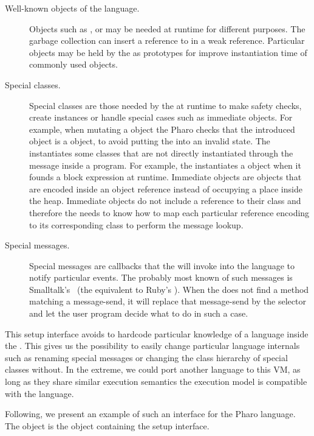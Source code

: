 \begin{description}
\item[Well-known objects of the language.] Objects such as ,  or  may be needed at runtime for different purposes. The garbage collection can insert a reference to  in a weak reference. Particular objects may be held by the \VM as prototypes for improve instantiation time of commonly used objects.
\item[Special classes.] Special classes are those needed by the \VM at runtime to make safety checks, create instances or handle special cases such as immediate objects. For example, when mutating a  object the Pharo \VM checks that the introduced object is a  object, to avoid putting the  into an invalid state. The \VM instantiates some classes that are not directly instantiated through the  message inside a program. For example, the \VM instantiates a  object when it founds a block expression at runtime. Immediate objects are objects that are encoded inside an object reference instead of occupying a place inside the heap. Immediate objects do not include a reference to their class and therefore the \VM needs to know how to map each particular reference encoding to its corresponding class to perform the message lookup. 
\item[Special messages.] Special messages are callbacks that the \VM will invoke into the language to notify particular events. The probably most known of such messages is Smalltalk's ~(the equivalent to Ruby's ). When the \VM does not find a method matching a message-send, it will replace that message-send by the  selector and let the user program decide what to do in such a case.
\end{description}

This \VM setup interface avoids to hardcode particular knowledge of a language inside the \VM. This gives us the possibility to easily change particular language internals such as renaming special messages or changing the class hierarchy of special classes without. In the extreme, we could port another language to this VM, as long as they share similar execution semantics \ie the \VM execution model is compatible with the language. 

Following, we present an example of such an interface for the Pharo language. The  object is the object containing the \VM setup interface.

